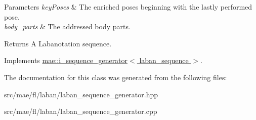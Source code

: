 \begin{DoxyParams}{Parameters}
{\em key\-Poses} & The enriched poses beginning with the lastly performed pose. \\
\hline
{\em body\-\_\-parts} & The addressed body parts. \\
\hline
\end{DoxyParams}
\begin{DoxyReturn}{Returns}
A Labanotation sequence. 
\end{DoxyReturn}


Implements \hyperlink{classmae_1_1i__sequence__generator_a305f7180d41a2b719d9ca36422408e33}{mae\-::i\-\_\-sequence\-\_\-generator$<$ laban\-\_\-sequence $>$}.



The documentation for this class was generated from the following files\-:\begin{DoxyCompactItemize}
\item 
src/mae/fl/laban/laban\-\_\-sequence\-\_\-generator.\-hpp\item 
src/mae/fl/laban/laban\-\_\-sequence\-\_\-generator.\-cpp\end{DoxyCompactItemize}
